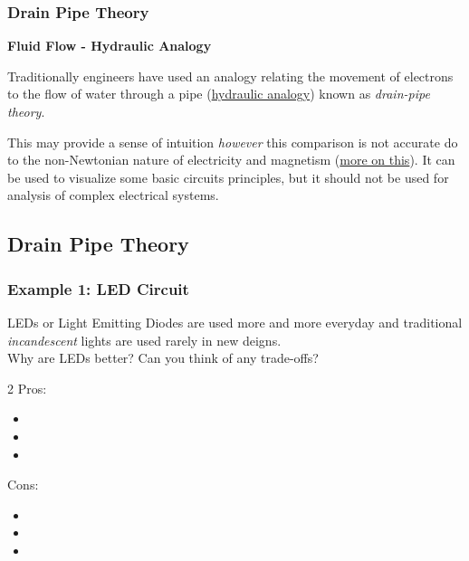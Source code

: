 \documentclass[fleqn]{ltx-talk} %
\newcommand{\sectionIIIsubsectionIItitle}{Drain Pipe Theory}
\newcommand{\sectionIIIsubsectionIIItitle}{Example 1: LED Circuit}
\begin{document}
			\begin{frame}
				\frametitle{\sectionIIIsubsectionIItitle}

				{\bfseries Fluid Flow - Hydraulic Analogy} \vspc
	
				Traditionally engineers have used an analogy relating the movement of electrons to the flow of water through a pipe (\href{https://en.wikipedia.org/wiki/Hydraulic_analogy}{\BL hydraulic analogy}) known as {\itshape drain-pipe theory}. \vspace{5mm}
				
				This may provide a sense of intuition {\itshape however} this comparison is not accurate do to the non-Newtonian nature of electricity and magnetism (\href{https://www.slideshare.net/PDiCEOThaneHeins3240/georgia-state-university-hyperphysics-how-newtonian-mechanics-is-incorrectly-being-applied-to-explain-the-laws-of-electricity-and-magnetism}{\GR more on this}). It can  be used to visualize some basic circuits principles, but it should not be used for analysis of complex electrical systems. 

			\end{frame}

		\subsection{\sectionIIIsubsectionIItitle}\label{sectionIIIsubsectionIII}

			\begin{frame}
				\frametitle{\sectionIIIsubsectionIIItitle}

				LEDs or Light Emitting Diodes are used more and more everyday and traditional {\itshape incandescent} lights are used rarely in new deigns.\\
				Why are LEDs better? Can you think of any trade-offs? \\

				\begin{multicols}{2}
					Pros:
					\begin{itemize}
						\item 
						\item
						\item
					\end{itemize}
					Cons:
					\begin{itemize}
						\item 
						\item
						\item
					\end{itemize}
				\end{multicols}

			\end{frame}
\end{document}

